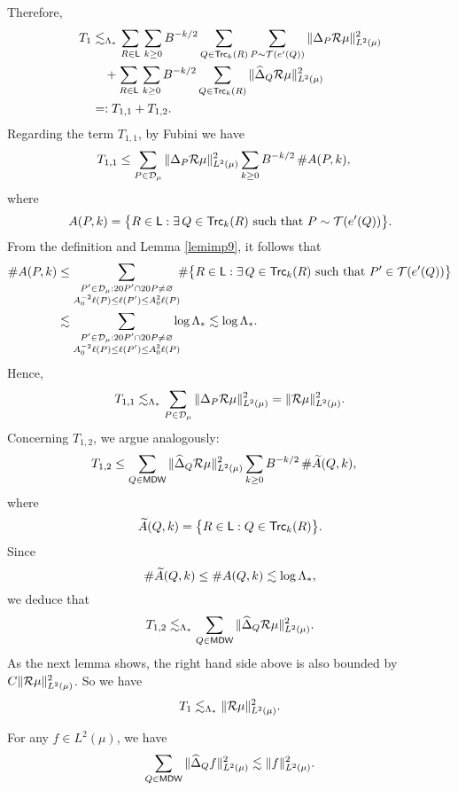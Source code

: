 Therefore,
\begin{align*}
T_1 & \lesssim_{\Lambda_*}\sum_{R\in{\mathsf{L}}}\,
\sum_{k\geq0} B^{-k/2} \sum_{Q\in{\mathsf{Trc}}_k(R)}
\sum_{P\sim{\mathcal T}(e'(Q))} \|\Delta_P {\mathcal R}\mu\|_{L^2(\mu)}^2\\
&\quad + \sum_{R\in{\mathsf{L}}}\,\sum_{k\geq0} B^{-k/2} \sum_{Q\in{\mathsf{Trc}}_k(R)}
\|{\widehat{\Delta}}_Q{\mathcal R}\mu\|_{L^2(\mu)}^2\\
& =: T_{1,1} + T_{1,2}.
\end{align*}
Regarding the term $T_{1,1}$, by Fubini we have
\begin{align*}
T_{1,1}
 &\leq
\sum_{P\in {\mathcal D}_\mu} \|\Delta_P {\mathcal R}\mu\|_{L^2(\mu)}^2
 \sum_{k\geq0} B^{-k/2}\,
\# A(P,k),
\end{align*}
where
\begin{equation}\label{eqApq2}
A(P,k)= 
\big\{R\in {\mathsf{L}}:\exists \,Q\in{\mathsf{Trc}}_k(R) \text{ such that }P\sim{\mathcal T}(e'(Q))\big\}.
\end{equation}
From the definition   and Lemma \ref{lemimp9}, it follows that
\begin{align*}
\#A(P,k) &\leq \sum_{\substack{
P'\in{\mathcal D}_\mu: 20P'\cap20P\neq\varnothing\\A_0^{-2}\ell(P)\leq \ell(P')\leq A_0^2\ell(P)
}} \!\!\#
\big\{R\in {\mathsf{L}}:\exists \,Q\in{\mathsf{Trc}}_k(R) \text{ such that }P'\in{\mathcal T}(e'(Q))\big\}\\
&\lesssim \sum_{\substack{
P'\in{\mathcal D}_\mu: 20P'\cap20P\neq\varnothing\\A_0^{-2}\ell(P)\leq \ell(P')\leq A_0^2\ell(P)
}}\!\!\!\!\log\Lambda_*\lesssim \log\Lambda_*.
\end{align*}
Hence,
$$T_{1,1}
 \lesssim_{\Lambda_*}
\sum_{P\in {\mathcal D}_\mu} \|\Delta_P {\mathcal R}\mu\|_{L^2(\mu)}^2= \|{\mathcal R}\mu\|_{L^2(\mu)}^2.$$
Concerning $T_{1,2}$, we argue analogously:
\begin{align*}
T_{1,2}
 &\le 
\sum_{Q\in {\mathsf{MDW}}} \|{\widehat{\Delta}}_Q{\mathcal R}\mu\|_{L^2(\mu)}^2
 \sum_{k\geq0} B^{-k/2}\,
\# {\widetilde{A}}(Q,k),
\end{align*}
where
$${\widetilde{A}}(Q,k)= \big\{R\in {\mathsf{L}}:
Q\in{\mathsf{Trc}}_k(R)\big\}.$$
Since 
$$\#{\widetilde{A}}(Q,k) \leq\#A(Q,k)\lesssim\log\Lambda_*,$$
we deduce that
$$T_{1,2}
 \lesssim_{\Lambda_*}
\sum_{Q\in {\mathsf{MDW}}} \|{\widehat{\Delta}}_Q {\mathcal R}\mu\|_{L^2(\mu)}^2.$$
As the next lemma shows, the right hand side above is also bounded by $C\|{\mathcal R}\mu\|_{L^2(\mu)}^2$.
So we have
$$T_1
 \lesssim_{\Lambda_*} \|{\mathcal R}\mu\|_{L^2(\mu)}^2.$$

\vv

\begin{lemma}\label{lemortog}
For any $f\in L^2(\mu)$, we have
$$\sum_{Q\in {\mathsf{MDW}}} \|{\widehat{\Delta}}_Q f\|_{L^2(\mu)}^2\lesssim \|f\|_{L^2(\mu)}^2.$$
\end{lemma}

